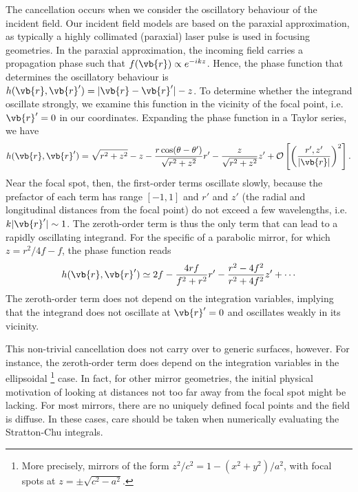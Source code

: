 \documentclass[11pt,SymmetricalJury]{inrsthesis/inrsthesis}
\begin{document}
The cancellation occurs when we consider the oscillatory behaviour of the
incident field. Our incident field models are based on the paraxial
approximation, as typically a highly collimated (paraxial) laser pulse is used
in focusing geometries. In the paraxial approximation, the incoming field
carries a propagation phase such that $f(\vb{r})\propto e^{-ikz}$. Hence, the
phase function that determines the oscillatory behaviour is
$h(\vb{r},\vb{r}')=|\vb{r}-\vb{r}'|-z$. To determine whether the integrand
oscillate strongly, we examine this function in the vicinity of the focal point,
i.e. $\vb{r}'=0$ in our coordinates. Expanding the phase function in a Taylor
series, we have
  \begin{equation}
    h(\vb{r},\vb{r}') = \sqrt{r^2+z^2}-z
                  -\frac{r\cos(\theta-\theta')}{\sqrt{r^2+z^2}} r'
                  -\frac{z}{\sqrt{r^2+z^2}}z'
                  + \mathcal{O}\left[\left(\frac{r',z'}{|\vb{r}|}\right)^2\right].
  \end{equation}
Near the focal spot, then, the first-order terms oscillate slowly, because the
prefactor of each term has range $[-1,1]$ and $r'$ and $z'$ (the radial and
longitudinal distances from the focal point) do not exceed a few wavelengths,
i.e. $k|\vb{r}'|\sim1$. The zeroth-order term is thus the only term that can
lead to a rapidly oscillating integrand. For the specific of a parabolic mirror,
for which $z=r^2/4f-f$, the phase function reads
  \begin{equation}
    h(\vb{r},\vb{r}')\simeq 2f - \frac{4rf}{f^2+r^2} r' - \frac{r^2-4f^2}{r^2+4f^2} z' + \cdots
    \label{eq:sc.parabola-phase-taylor}
  \end{equation}
The zeroth-order term does not depend on the integration variables, implying
that the integrand does not oscillate at $\vb{r}'=0$ and oscillates weakly
in its vicinity.

This non-trivial cancellation does not carry over to generic surfaces, however.
For instance, the zeroth-order term does depend on the integration variables
in the ellipsoidal \footnote{More precisely,
mirrors of the form $z^2/c^2=1-(x^2+y^2)/a^2$, with focal spots
at $z=\pm\sqrt{c^2-a^2}$.} case. In fact, for other mirror geometries, the initial
physical motivation of looking at distances not too far away from the focal spot
might be lacking. For most mirrors, there are no uniquely
defined focal points and the field is diffuse. In these cases, care
should be taken when numerically evaluating the Stratton-Chu integrals.
\end{document}
